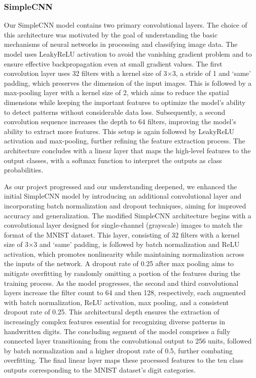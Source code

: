 \subsubsection{SimpleCNN}\label{simplecnn}

Our SimpleCNN model contains two primary convolutional layers. The choice of this architecture was motivated by the goal of understanding the basic mechanisms of neural networks in processing and classifying image data. The model uses LeakyReLU activation to avoid the vanishing gradient problem and to ensure effective backpropagation even at small gradient values. The first convolution layer uses 32 filters with a kernel size of 3$\times$3, a stride of 1 and `same' padding, which preserves the dimension of the input images. This is followed by a max-pooling layer with a kernel size of 2, which aims to reduce the spatial dimensions while keeping the important features to optimize the model's ability to detect patterns without considerable data loss. Subsequently, a second convolution sequence increases the depth to 64 filters, improving the model's ability to extract more features. This setup is again followed by LeakyReLU activation and max-pooling, further refining the feature extraction process. The architecture concludes with a linear layer that maps the high-level features to the output classes, with a softmax function to interpret the outputs as class probabilities.

As our project progressed and our understanding deepened, we enhanced the initial SimpleCNN model by introducing an additional convolutional layer and incorporating batch normalization and dropout techniques, aiming for improved accuracy and generalization. The modified SimpleCNN architecture begins with a convolutional layer designed for single-channel (grayscale) images to match the format of the MNIST dataset. This layer, consisting of 32 filters with a kernel size of 3$\times$3 and `same' padding, is followed by batch normalization and ReLU activation, which promotes nonlinearity while maintaining normalization across the inputs of the network. A dropout rate of 0.25 after max pooling aims to mitigate overfitting by randomly omitting a portion of the features during the training process. As the model progresses, the second and third convolutional layers increase the filter count to 64 and then 128, respectively, each augmented with batch normalization, ReLU activation, max pooling, and a consistent dropout rate of 0.25. This architectural depth ensures the extraction of increasingly complex features essential for recognizing diverse patterns in handwritten digits. The concluding segment of the model comprises a fully connected layer transitioning from the convolutional output to 256 units, followed by batch normalization and a higher dropout rate of 0.5, further combating overfitting. The final linear layer maps these processed features to the ten class outputs corresponding to the MNIST dataset's digit categories.

